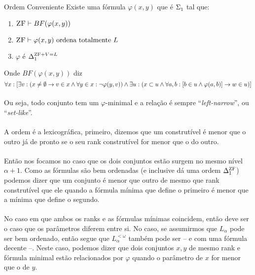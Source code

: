             \begin{lemma}{Ordem Conveniente}
                Existe uma fórmula $\varphi(x,y)$ que é $\Sigma^{}_{1}$ tal que:
                \begin{enumerate}
                    \item $\text{\sc ZF}\vdash BF(\varphi(x,y))$
                    \item $\text{\sc ZF}\vdash\varphi(x,y)\text{ ordena totalmente }L$
                    \item $\varphi$ é $\Delta^{\text{\sc ZF}+V=L}_{1}$
                \end{enumerate} 
                Onde $BF(\varphi(x,y))$ diz 
                $$\forall x:[\exists v:(x\not = \emptyset \rightarrow v\in x \land \forall y\in x: \neg \varphi(y,v) )\land \exists u:(x\subset u\land \forall a,b: [b\in u \land \varphi(a,b)]\rightarrow w\in u)]$$
                \paragraph{}
                    Ou seja, todo conjunto tem um $\varphi$-minimal e a relação é sempre ``\textit{left-narrow}'', ou ``\textit{set-like}''.
                \paragraph{}
                    A ordem é a lexicográfica, primeiro, dizemos que um construtível é menor que o outro já de pronto se o seu 
                    rank construtível for menor que o do outro. 
                \paragraph{}
                    Então nos focamos no caso que os dois conjuntos estão surgem 
                    no mesmo nível $\alpha+1$. Como as fórmulas são bem ordenadas (e inclusive \cite{Drake} dá uma ordem $\Delta^{\text{\sc ZF}}_{1}$)
                    podemos dizer que um conjunto é menor que outro de mesmo que rank construtível que ele quando a fórmula mínima que 
                    define o primeiro é menor que a mínima que define o segundo.
                \paragraph{}
                    No caso em que ambos os ranks e as fórmulas mínimas coincidem, então deve ser o caso que os parâmetros diferem entre 
                    si. No caso, se assumirmos que $L_\alpha$ pode ser bem ordenado, então segue que $L_\alpha^{<\omega}$ também pode 
                    ser -- e com uma fórmula decente --. Neste caso, podemos dizer que dois conjuntos $x,y$ de mesmo rank e fórmula 
                    minimal estão relacionados por $\varphi$ quando o parâmetro de $x$ for menor que o de $y$.
            \end{lemma}
